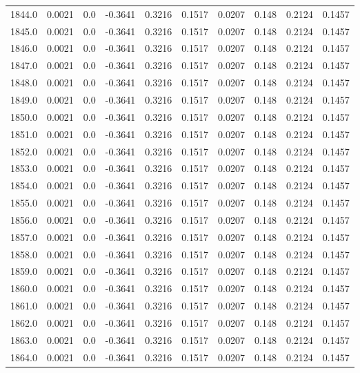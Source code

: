 \begin{longtable}{lrrrrrrrrr}
1844.0 & 0.0021 & 0.0 & -0.3641 & 0.3216 & 0.1517 & 0.0207 & 0.148 & 0.2124 & 0.1457 \\
1845.0 & 0.0021 & 0.0 & -0.3641 & 0.3216 & 0.1517 & 0.0207 & 0.148 & 0.2124 & 0.1457 \\
1846.0 & 0.0021 & 0.0 & -0.3641 & 0.3216 & 0.1517 & 0.0207 & 0.148 & 0.2124 & 0.1457 \\
1847.0 & 0.0021 & 0.0 & -0.3641 & 0.3216 & 0.1517 & 0.0207 & 0.148 & 0.2124 & 0.1457 \\
1848.0 & 0.0021 & 0.0 & -0.3641 & 0.3216 & 0.1517 & 0.0207 & 0.148 & 0.2124 & 0.1457 \\
1849.0 & 0.0021 & 0.0 & -0.3641 & 0.3216 & 0.1517 & 0.0207 & 0.148 & 0.2124 & 0.1457 \\
1850.0 & 0.0021 & 0.0 & -0.3641 & 0.3216 & 0.1517 & 0.0207 & 0.148 & 0.2124 & 0.1457 \\
1851.0 & 0.0021 & 0.0 & -0.3641 & 0.3216 & 0.1517 & 0.0207 & 0.148 & 0.2124 & 0.1457 \\
1852.0 & 0.0021 & 0.0 & -0.3641 & 0.3216 & 0.1517 & 0.0207 & 0.148 & 0.2124 & 0.1457 \\
1853.0 & 0.0021 & 0.0 & -0.3641 & 0.3216 & 0.1517 & 0.0207 & 0.148 & 0.2124 & 0.1457 \\
1854.0 & 0.0021 & 0.0 & -0.3641 & 0.3216 & 0.1517 & 0.0207 & 0.148 & 0.2124 & 0.1457 \\
1855.0 & 0.0021 & 0.0 & -0.3641 & 0.3216 & 0.1517 & 0.0207 & 0.148 & 0.2124 & 0.1457 \\
1856.0 & 0.0021 & 0.0 & -0.3641 & 0.3216 & 0.1517 & 0.0207 & 0.148 & 0.2124 & 0.1457 \\
1857.0 & 0.0021 & 0.0 & -0.3641 & 0.3216 & 0.1517 & 0.0207 & 0.148 & 0.2124 & 0.1457 \\
1858.0 & 0.0021 & 0.0 & -0.3641 & 0.3216 & 0.1517 & 0.0207 & 0.148 & 0.2124 & 0.1457 \\
1859.0 & 0.0021 & 0.0 & -0.3641 & 0.3216 & 0.1517 & 0.0207 & 0.148 & 0.2124 & 0.1457 \\
1860.0 & 0.0021 & 0.0 & -0.3641 & 0.3216 & 0.1517 & 0.0207 & 0.148 & 0.2124 & 0.1457 \\
1861.0 & 0.0021 & 0.0 & -0.3641 & 0.3216 & 0.1517 & 0.0207 & 0.148 & 0.2124 & 0.1457 \\
1862.0 & 0.0021 & 0.0 & -0.3641 & 0.3216 & 0.1517 & 0.0207 & 0.148 & 0.2124 & 0.1457 \\
1863.0 & 0.0021 & 0.0 & -0.3641 & 0.3216 & 0.1517 & 0.0207 & 0.148 & 0.2124 & 0.1457 \\
1864.0 & 0.0021 & 0.0 & -0.3641 & 0.3216 & 0.1517 & 0.0207 & 0.148 & 0.2124 & 0.1457 \\

\end{longtable}
